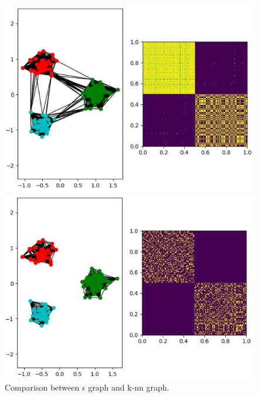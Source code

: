 \documentclass[a4paper, 11pt]{report}
\begin{document}
    \begin{figure}[!h]
     \begin{minipage}{0.5\textwidth}
     \begin{center}
         \includegraphics[scale=0.75]{images/eps_05_blobs.jpg}
         \caption{$\epsilon = 0.5$}
     \end{center}
     \end{minipage}
     \hfill
     \begin{minipage}{0.5\textwidth}
     \begin{center}
         \includegraphics[scale=0.75]{images/knn_20_blobs.jpg}
         \caption{$k = 20$}
     \end{center}
     \end{minipage}
        \caption{Comparison between $\epsilon$ graph and k-nn graph.}
        \label{fig:blobs-dataset}
    \end{figure}
\end{document}
